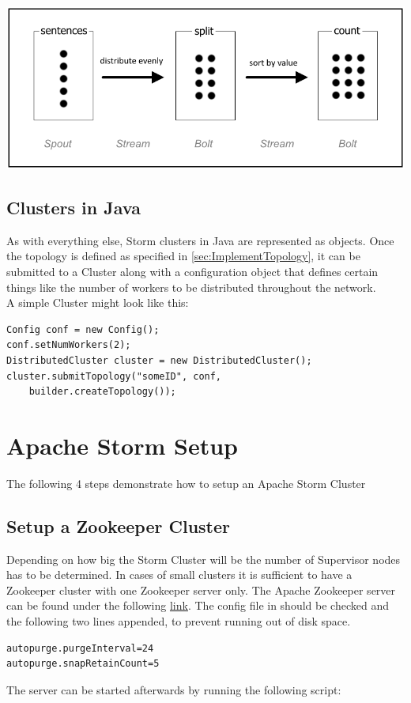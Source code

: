 \documentclass[12pt,a4paper]{article}
\begin{document}
\includegraphics[width=\textwidth]{images/WordCountGraph.png} 

\subsection{Clusters in Java}
\label{sec:ImplementCluster}
As with everything else, Storm clusters in Java are represented as objects. Once the topology is defined as specified in \ref{sec:ImplementTopology}, it can be submitted to a Cluster along with a configuration object that defines certain things like the number of workers to be distributed throughout the network.\\

A simple Cluster might look like this:
\begin{lstlisting}
Config conf = new Config();
conf.setNumWorkers(2);
DistributedCluster cluster = new DistributedCluster();
cluster.submitTopology("someID", conf,
    builder.createTopology());
\end{lstlisting}
\section{Apache Storm Setup}
The following 4 steps demonstrate how to setup an Apache Storm Cluster
\subsection{Setup a Zookeeper Cluster}
Depending on how big the Storm Cluster will be the number of Supervisor nodes has to be determined. In cases of small clusters it is sufficient to have a Zookeeper cluster with one Zookeeper server only.
The Apache Zookeeper server can be found under the following \href{http://www.eu.apache.org/dist/zookeeper/stable/}{link}. The config file in  should be checked and the following two lines appended, to prevent running out of disk space.
\begin{verbatim}
autopurge.purgeInterval=24
autopurge.snapRetainCount=5  
\end{verbatim}
The server can be started afterwards by running the following script: 
\end{document}
